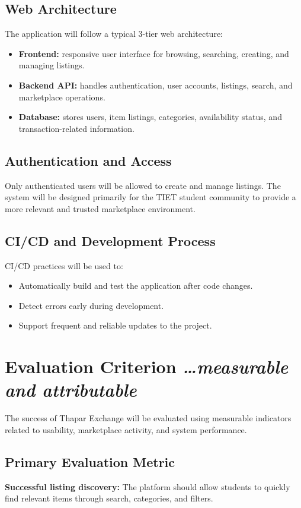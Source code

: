 \documentclass[11pt,a4paper]{article}
\newcommand{\BvrHint}[1]{%
  {\normalfont\normalsize\itshape\hfill #1}}
\begin{document}
\subsection{Web Architecture}
The application will follow a typical 3-tier web architecture:
\begin{itemize}[leftmargin=0.7cm]
    \item \textbf{Frontend:} responsive user interface for browsing, searching, creating, and managing listings.
    \item \textbf{Backend API:} handles authentication, user accounts, listings, search, and marketplace operations.
    \item \textbf{Database:} stores users, item listings, categories, availability status, and transaction-related information.
\end{itemize}

\subsection{Authentication and Access}
Only authenticated users will be allowed to create and manage listings. The system will be designed primarily for the TIET student community to provide a more relevant and trusted marketplace environment.

\subsection{CI/CD and Development Process}
CI/CD practices will be used to:
\begin{itemize}[leftmargin=0.7cm]
    \item Automatically build and test the application after code changes.
    \item Detect errors early during development.
    \item Support frequent and reliable updates to the project.
\end{itemize}
\section{Evaluation Criterion %
\BvrHint{\ldots measurable and attributable}}

The success of Thapar Exchange will be evaluated using measurable indicators related to usability, marketplace activity, and system performance.

\subsection{Primary Evaluation Metric}
\textbf{Successful listing discovery:} The platform should allow students to quickly find relevant items through search, categories, and filters.
\end{document}
